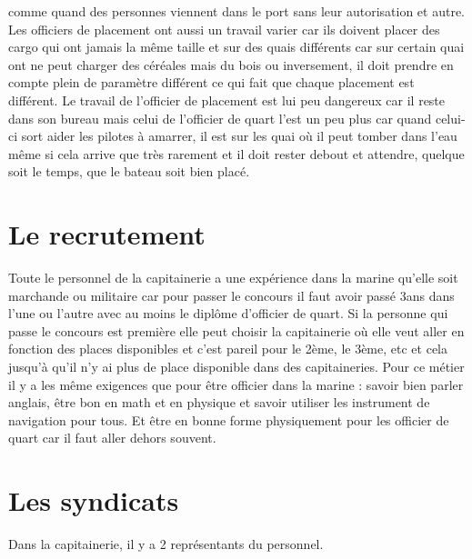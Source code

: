 comme quand des personnes viennent dans le port sans leur autorisation et autre.
Les officiers de placement ont aussi un travail varier car ils doivent
placer des cargo qui ont jamais la même taille et sur des quais différents
car sur certain quai ont ne peut charger des céréales mais du bois ou inversement,
il doit prendre en compte plein de paramètre différent ce qui fait que chaque placement est différent.
Le travail de l'officier de placement est lui peu dangereux car il reste
dans son bureau mais celui de l'officier de quart l'est un peu plus
car quand celui-ci sort aider les pilotes à amarrer,
il est sur les quai où il peut tomber dans l'eau même si cela arrive que très rarement et il doit rester debout et attendre,
quelque soit le temps, que le bateau soit bien placé.



\section{Le recrutement}

Toute le personnel de la capitainerie a une expérience dans la marine
qu'elle soit marchande ou militaire car pour passer le concours il
faut avoir passé 3ans dans l'une ou l'autre avec au moins le diplôme d'officier de quart.
Si la personne qui passe le concours est première elle peut choisir
la capitainerie où elle veut aller en fonction des places disponibles
et c'est pareil pour le 2ème, le 3ème, etc et cela jusqu'à qu'il n'y ai plus de place disponible dans des capitaineries.
Pour ce métier il y a les même exigences que pour être officier dans la marine :
savoir bien parler anglais, être bon en math et en physique et savoir utiliser les instrument de navigation pour tous.
Et être en bonne forme physiquement pour les officier de quart car il faut aller dehors souvent.

\section{Les syndicats}

Dans la capitainerie, il y a 2 représentants du personnel.

